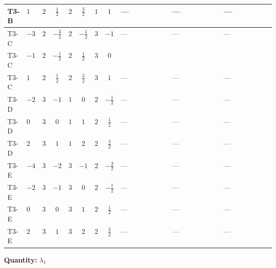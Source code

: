 \documentclass[8pt]{article}
\begin{document}
\begin{landscape}
\begin{longtable}{@{}llcccccc >{\raggedright\arraybackslash}p{0.21\linewidth} >{\raggedright\arraybackslash}p{0.21\linewidth} >{\raggedright\arraybackslash}p{0.21\linewidth}@{}}
\midrule
T3-B & $1$ & $2$ & $\frac{1}{2}$ & $2$ & $\frac{3}{2}$ & $1$ & $1$ & --- & --- & --- \\
\midrule
T3-C & $-3$ & $2$ & $-\frac{3}{2}$ & $2$ & $-\frac{1}{2}$ & $3$ & $-1$ & --- & --- & --- \\
\midrule
T3-C & $-1$ & $2$ & $-\frac{1}{2}$ & $2$ & $\frac{1}{2}$ & $3$ & $0$ & \scriptsize\adjustbox{max width=\linewidth}{$\begin{gathered} +8 {\lambda_{7}} \left({\lambda_{7}}\right)^{*}\end{gathered}$} & \scriptsize\adjustbox{max width=\linewidth}{$\begin{gathered} +4 {\lambda_{H H^\dagger S_1^\dagger S_2^\dagger}^{\rm Cross}} \left({\lambda_{H H^\dagger S_1^\dagger S_2^\dagger}^{\rm Cross}}\right)^{*}\end{gathered}$} & \scriptsize\adjustbox{max width=\linewidth}{$\begin{gathered} +8 {\lambda_{8}} \left({\lambda_{8}}\right)^{*}\end{gathered}$} \\
\midrule
T3-C & $1$ & $2$ & $\frac{1}{2}$ & $2$ & $\frac{3}{2}$ & $3$ & $1$ & --- & --- & --- \\
\midrule
T3-D & $-2$ & $3$ & $-1$ & $1$ & $0$ & $2$ & $-\frac{1}{2}$ & --- & --- & --- \\
\midrule
T3-D & $0$ & $3$ & $0$ & $1$ & $1$ & $2$ & $\frac{1}{2}$ & --- & --- & --- \\
\midrule
T3-D & $2$ & $3$ & $1$ & $1$ & $2$ & $2$ & $\frac{3}{2}$ & --- & --- & --- \\
\midrule
T3-E & $-4$ & $3$ & $-2$ & $3$ & $-1$ & $2$ & $-\frac{3}{2}$ & --- & --- & --- \\
\midrule
T3-E & $-2$ & $3$ & $-1$ & $3$ & $0$ & $2$ & $-\frac{1}{2}$ & --- & --- & --- \\
\midrule
T3-E & $0$ & $3$ & $0$ & $3$ & $1$ & $2$ & $\frac{1}{2}$ & --- & --- & --- \\
\midrule
T3-E & $2$ & $3$ & $1$ & $3$ & $2$ & $2$ & $\frac{3}{2}$ & --- & --- & --- \\
\midrule
\bottomrule
\end{longtable}
\clearpage
\noindent\textbf{Quantity: }$\lambda_1$\par\smallskip

\end{landscape}
\end{document}
